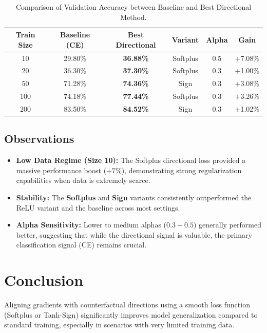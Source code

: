 \documentclass{article}
\begin{document}
\begin{table}[h]
\centering
\begin{tabular}{@{}cccccc@{}}
\toprule
\textbf{Train Size} & \textbf{Baseline (CE)} & \textbf{Best Directional} & \textbf{Variant} & \textbf{Alpha} & \textbf{Gain} \\ \midrule
10 & 29.80\% & \textbf{36.88\%} & Softplus & 0.5 & +7.08\% \\
20 & 36.30\% & \textbf{37.30\%} & Softplus & 0.3 & +1.00\% \\
50 & 71.28\% & \textbf{74.36\%} & Sign & 0.3 & +3.08\% \\
100 & 74.18\% & \textbf{77.44\%} & Softplus & 0.3 & +3.26\% \\
200 & 83.50\% & \textbf{84.52\%} & Sign & 0.3 & +1.02\% \\ \bottomrule
\end{tabular}
\caption{Comparison of Validation Accuracy between Baseline and Best Directional Method.}
\label{tab:results}
\end{table}

\subsection{Observations}
\begin{itemize}
    \item \textbf{Low Data Regime (Size 10):} The Softplus directional loss provided a massive performance boost ($+7\%$), demonstrating strong regularization capabilities when data is extremely scarce.
    \item \textbf{Stability:} The \textbf{Softplus} and \textbf{Sign} variants consistently outperformed the ReLU variant and the baseline across most settings.
    \item \textbf{Alpha Sensitivity:} Lower to medium alphas ($0.3 - 0.5$) generally performed better, suggesting that while the directional signal is valuable, the primary classification signal (CE) remains crucial.
\end{itemize}

\section{Conclusion}
Aligning gradients with counterfactual directions using a smooth loss function (Softplus or Tanh-Sign) significantly improves model generalization compared to standard training, especially in scenarios with very limited training data.
\end{document}
